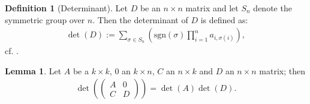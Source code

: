 \documentclass[12pt, a4paper]{article}
\numberwithin{equation}{section}
\theoremstyle{definition}
\theoremstyle{definition}
\newtheorem{defn}[thm]{Definition} %
\newtheorem{lemma}[thm]{Lemma} %
\begin{document}
	\begin{defn}[Determinant]
		Let $D$ be an $n\times n$ matrix and let $S_n$ denote the symmetric group over $n$. Then the determinant of $D$ is defined as:  
		\begin{align}
			\det(D) := \sum_{\sigma\in S_n} \left( \text{sgn}(\sigma) \prod_{i = 1}^{n}a_{i, \sigma(i)} \right),  
		\end{align}
		cf. \cite{leibniz-formula}. 
	\end{defn}

	\begin{lemma}
		Let $A$ be a $k\times k$, $0$ an $k\times n$, $C$ an $n\times k$ and $D$ an $n\times n$ matrix; then 
		\begin{align}
			\det\left( \begin{pmatrix}	A & 0 \\ C & D \end{pmatrix} \right) = \det(A)\det(D). 
		\end{align}
	\end{lemma}
	
\end{document}
